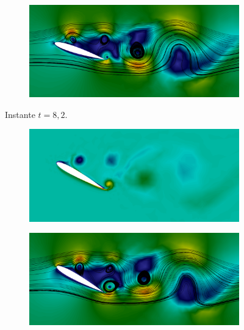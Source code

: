\begin{figure}[h!]
\begin{subfigure}{.49\linewidth}
    \end{subfigure}
    \begin{subfigure}{.49\linewidth}
        \centering
        \includegraphics[width=\linewidth]{Figuras/rotating-airfoil/str2.png}
    \end{subfigure}
    \caption*{Instante $t=8,2$.}
    \begin{subfigure}{.49\linewidth}
        \centering
        \includegraphics[width=\linewidth]{Figuras/rotating-airfoil/vort3.png}
    \end{subfigure}
    \begin{subfigure}{.49\linewidth}
        \centering
        \includegraphics[width=\linewidth]{Figuras/rotating-airfoil/str3.png}
    \end{subfigure}
    \caption*{Instante $t=8,4$.}
    \begin{subfigure}{.49\linewidth}

\end{subfigure}
\end{figure}
